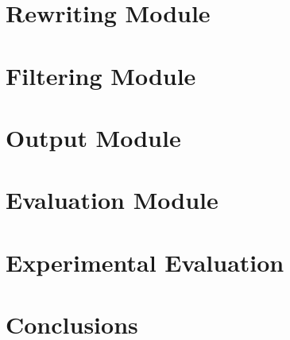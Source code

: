 \documentclass[pdftex]{pucthesis}	%
\begin{document}
\chapter[REWRITING MODULE]{Rewriting Module} \label{chpt:rewriting}


\chapter[FILTERING MODULE]{Filtering Module} \label{chpt:filtering}


\chapter[OUTPUT MODULE]{Output Module} \label{chpt:output}


\chapter[EVALUATION MODULE]{Evaluation Module} \label{chpt:evaluation}


\chapter[EXPERIMENTAL EVALUATION]{Experimental Evaluation} \label{chpt:experiments}


\chapter[CONCLUSIONS]{Conclusions} \label{chpt:conclusions}



\cleardoublepage
{} \label{references}

\renewcommand{\bibname}{REFERENCES}
\setlength{\bibleftmargin}{0em}
\setlength{\bibindent}{0em}
\setlength{\bibitemsep}{1em}




% 
\end{document}
